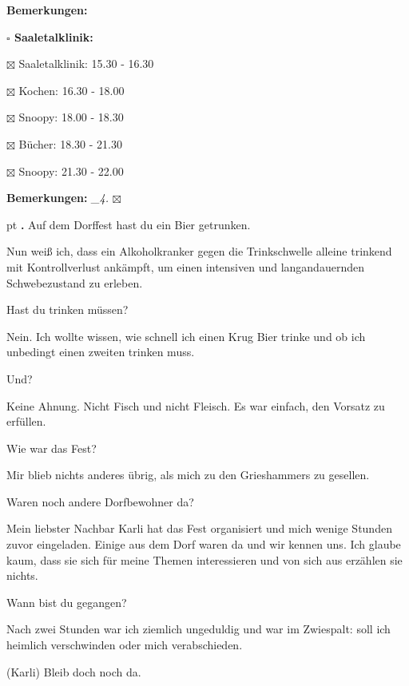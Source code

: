 \documentclass[10pt,a4paper]{article}
\newcounter{notec}
\newcommand\notep[1]{%
  \stepcounter{notec}
  \vskip #1pt
  {\bf\arabic{notec}.}
}
\newcommand\prop[1] {{\color {alizarin} {\bf #1}}}        %
\newcommand\mand[1] {{\color {burntorange} {\bf #1}}}     %
\newcommand\bottomspace{\vskip 4pt}
\newcommand\n[1] { {\sl #1.} \hskip 5pt }
\begin{document}
\begin{mdframed}[style=daystyle]
\begin{labeling}{{\mand {Bemerkungen:}}}
\begin{minipage}{0.75\textwidth}
\begin{labeling}{\prop {$\square$ {Saaletalklinik:}}}
      \item[$\boxtimes$ Saaletalklinik:] 15.30 - 16.30
      \item[$\boxtimes$ Kochen:]         16.30 - 18.00
      \item[$\boxtimes$ Snoopy:]         18.00 - 18.30
      \item[$\boxtimes$ Bücher:]         18.30 - 21.30
      \item[$\boxtimes$ Snoopy:]         21.30 - 22.00        
      \end{labeling}
    \end{minipage}
    \bottomspace
  \item[{\mand {Bemerkungen:}}]   \n{\_4} $\boxtimes$
  \end{labeling}
    
  \setcounter{notec}{0}

  \notep 0 Auf dem Dorffest hast du ein Bier getrunken.

  \vskip 2pt
  Nun weiß ich, dass ein Alkoholkranker gegen die Trinkschwelle alleine trinkend
  mit Kontrollverlust ankämpft, um einen intensiven und langandauernden Schwebezustand zu erleben.

  \vskip 2pt
  Hast du trinken müssen?

  \vskip 2pt
  Nein. Ich wollte wissen, wie schnell ich einen Krug Bier trinke und ob ich
  unbedingt einen zweiten trinken muss.

  \vskip 2pt
  Und?

  \vskip 2pt
  Keine Ahnung. Nicht Fisch und nicht Fleisch. Es war einfach, den Vorsatz zu
  erfüllen.

  \vskip 2pt
  Wie war das Fest?

  \vskip 2pt
  Mir blieb nichts anderes übrig, als mich zu den Grieshammers zu gesellen.

  \vskip 2pt
  Waren noch andere Dorfbewohner da?

  \vskip 2pt
  Mein liebster Nachbar Karli hat das Fest organisiert und mich wenige Stunden
  zuvor eingeladen. Einige aus dem Dorf waren da und wir kennen uns. Ich glaube
  kaum, dass sie sich für meine Themen interessieren und von sich aus erzählen
  sie nichts.

  \vskip 2pt
  Wann bist du gegangen?

  \vskip 2pt
  Nach zwei Stunden war ich ziemlich ungeduldig und war im Zwiespalt: soll ich
  heimlich verschwinden oder mich verabschieden.

  \vskip 2pt
  (Karli)
  Bleib doch noch da.


\end{mdframed}
\end{document}
